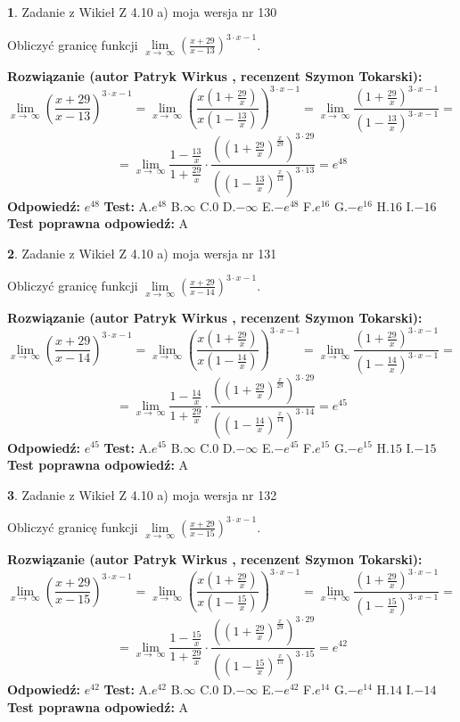 \documentclass[12pt, a4paper]{article}
\theoremstyle{definition} %
\newtheorem{zad}{}
\newcommand{\zadStart}[1]{\begin{zad}#1\newline}
\newcommand{\zadStop}{\end{zad}}
\newcommand{\rozwStart}[2]{\noindent \textbf{Rozwiązanie (autor #1 , recenzent #2): }\newline}
\newcommand{\rozwStop}{\newline}
\newcommand{\odpStart}{\noindent \textbf{Odpowiedź:}\newline}
\newcommand{\odpStop}{\newline}
\newcommand{\testStart}{\noindent \textbf{Test:}\newline}
\newcommand{\testStop}{\newline}
\newcommand{\kluczStart}{\noindent \textbf{Test poprawna odpowiedź:}\newline}
\newcommand{\kluczStop}{\newline}
\begin{document}
\zadStart{Zadanie z Wikieł Z 4.10 a) moja wersja nr 130}

Obliczyć granicę funkcji  $\lim\limits_{x\to\ \infty}(\frac{x+29}{x-13})^{3\cdot x-1}$.
\zadStop
\rozwStart{Patryk Wirkus}{Szymon Tokarski}
$$\lim\limits_{x\to\ \infty}(\frac{x+29}{x-13})^{3\cdot x-1} = \lim\limits_{x\to\ \infty}(\frac{x(1+\frac{29}{x})}{x(1-\frac{13}{x})})^{3\cdot x-1}=\lim\limits_{x\to\ \infty}\frac{(1+\frac{29}{x})^{3\cdot x-1}}{(1-\frac{13}{x})^{3\cdot x-1}}=$$
$$=\lim\limits_{x\to\ \infty}\frac{1-\frac{13}{x}}{1+\frac{29}{x}}\cdot\frac{((1+\frac{29}{x})^{\frac{x}{29}})^{3\cdot29}}{((1-\frac{13}{x})^{\frac{x}{13}})^{3\cdot13}}=e^{48}$$
\rozwStop
\odpStart
$e^{48}$
\odpStop
\testStart
A.$e^{48}$ B.$\infty$ C.$0$ D.$-\infty$ E.$-e^{48}$
F.$e^{16}$ G.$-e^{16}$
H.$16$
I.$-16$
\testStop
\kluczStart
A
\kluczStop



\zadStart{Zadanie z Wikieł Z 4.10 a) moja wersja nr 131}

Obliczyć granicę funkcji  $\lim\limits_{x\to\ \infty}(\frac{x+29}{x-14})^{3\cdot x-1}$.
\zadStop
\rozwStart{Patryk Wirkus}{Szymon Tokarski}
$$\lim\limits_{x\to\ \infty}(\frac{x+29}{x-14})^{3\cdot x-1} = \lim\limits_{x\to\ \infty}(\frac{x(1+\frac{29}{x})}{x(1-\frac{14}{x})})^{3\cdot x-1}=\lim\limits_{x\to\ \infty}\frac{(1+\frac{29}{x})^{3\cdot x-1}}{(1-\frac{14}{x})^{3\cdot x-1}}=$$
$$=\lim\limits_{x\to\ \infty}\frac{1-\frac{14}{x}}{1+\frac{29}{x}}\cdot\frac{((1+\frac{29}{x})^{\frac{x}{29}})^{3\cdot29}}{((1-\frac{14}{x})^{\frac{x}{14}})^{3\cdot14}}=e^{45}$$
\rozwStop
\odpStart
$e^{45}$
\odpStop
\testStart
A.$e^{45}$ B.$\infty$ C.$0$ D.$-\infty$ E.$-e^{45}$
F.$e^{15}$ G.$-e^{15}$
H.$15$
I.$-15$
\testStop
\kluczStart
A
\kluczStop



\zadStart{Zadanie z Wikieł Z 4.10 a) moja wersja nr 132}

Obliczyć granicę funkcji  $\lim\limits_{x\to\ \infty}(\frac{x+29}{x-15})^{3\cdot x-1}$.
\zadStop
\rozwStart{Patryk Wirkus}{Szymon Tokarski}
$$\lim\limits_{x\to\ \infty}(\frac{x+29}{x-15})^{3\cdot x-1} = \lim\limits_{x\to\ \infty}(\frac{x(1+\frac{29}{x})}{x(1-\frac{15}{x})})^{3\cdot x-1}=\lim\limits_{x\to\ \infty}\frac{(1+\frac{29}{x})^{3\cdot x-1}}{(1-\frac{15}{x})^{3\cdot x-1}}=$$
$$=\lim\limits_{x\to\ \infty}\frac{1-\frac{15}{x}}{1+\frac{29}{x}}\cdot\frac{((1+\frac{29}{x})^{\frac{x}{29}})^{3\cdot29}}{((1-\frac{15}{x})^{\frac{x}{15}})^{3\cdot15}}=e^{42}$$
\rozwStop
\odpStart
$e^{42}$
\odpStop
\testStart
A.$e^{42}$ B.$\infty$ C.$0$ D.$-\infty$ E.$-e^{42}$
F.$e^{14}$ G.$-e^{14}$
H.$14$
I.$-14$
\testStop
\kluczStart
A
\kluczStop
\end{document}
